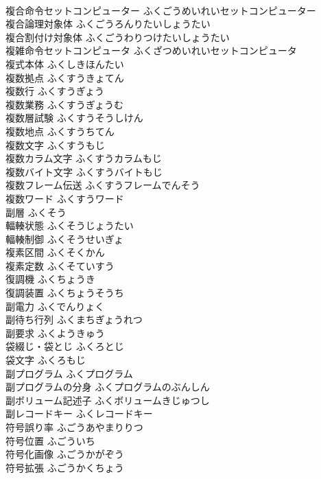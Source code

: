 \documentclass[8pt]{extreport}
\begin{document}
\begin{CJK}{UTF8}{min}
\\	複合命令セットコンピューター	ふくごうめいれいセットコンピューター	
\\	複合論理対象体	ふくごうろんりたいしょうたい	
\\	複合割付け対象体	ふくごうわりつけたいしょうたい	
\\	複雑命令セットコンピュータ	ふくざつめいれいセットコンピュータ	
\\	複式本体	ふくしきほんたい	
\\	複数拠点	ふくすうきょてん	
\\	複数行	ふくすうぎょう	
\\	複数業務	ふくすうぎょうむ	
\\	複数層試験	ふくすうそうしけん	
\\	複数地点	ふくすうちてん	
\\	複数文字	ふくすうもじ	
\\	複数カラム文字	ふくすうカラムもじ	
\\	複数バイト文字	ふくすうバイトもじ	
\\	複数フレーム伝送	ふくすうフレームでんそう	
\\	複数ワード	ふくすうワード	
\\	副層	ふくそう	
\\	輻輳状態	ふくそうじょうたい	
\\	輻輳制御	ふくそうせいぎょ	
\\	複素区間	ふくそくかん	
\\	複素定数	ふくそていすう	
\\	復調機	ふくちょうき	
\\	復調装置	ふくちょうそうち	
\\	副電力	ふくでんりょく	
\\	副待ち行列	ふくまちぎょうれつ	
\\	副要求	ふくようきゅう	
\\	袋綴じ・袋とじ	ふくろとじ	
\\	袋文字	ふくろもじ	
\\	副プログラム	ふくプログラム	
\\	副プログラムの分身	ふくプログラムのぶんしん	
\\	副ボリューム記述子	ふくボリュームきじゅつし	
\\	副レコードキー	ふくレコードキー	
\\	符号誤り率	ふごうあやまりりつ	
\\	符号位置	ふごういち	
\\	符号化画像	ふごうかがぞう	
\\	符号拡張	ふごうかくちょう	

\end{CJK}
\end{document}
